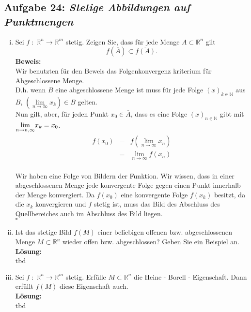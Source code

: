 \subsection*{Aufgabe 24: \mdseries\itshape Stetige Abbildungen auf Punktmengen}
\begin{enumerate}[(i)]
    \item Sei $f \; : \; \mathbb{R}^n \rightarrow \mathbb{R}^m$ stetig. Zeigen Sie, dass für jede
        Menge $ A \subset \mathbb{R}^n$ gilt
        $$
            f(\overline{A}) \subset \overline{f(A)}.
        $$
    \textbf{Beweis:}\\
        Wir benutzten für den Beweis das Folgenkonvergenz kriterium für Abgeschlossene Menge.\\
        D.h. wenn $B$ eine abgeschlossene Menge ist muss
        für jede Folge $(x)_{k\in \mathbb{N}}$ aus $B$,
        $\left( \underset{n \rightarrow \infty}{\lim} x_k \right) \in B$ gelten.\\

        Nun gilt, aber, für jeden Punkt $x_0 \in \overline{A}$, dass es eine Folge
        $(x)_{n \in \mathbb{N}}$ gibt mit $\underset{ n \rightarrow n,\infty}{\lim} x_k = x_0$.
        $$\begin{array}{rcl}
            f(x_0) &=& f(\underset{n \rightarrow \infty}{\lim} x_n)\\
                &=& \underset{n \rightarrow \infty}{\lim} f(x_n)\\
        \end{array}$$

        Wir haben eine Folge von Bildern der Funktion. Wir wissen, dass in einer abgeschlossenen
        Menge jede konvergente Folge gegen einen Punkt innerhalb der Menge konvergiert.
        Da $f(x_0)$ eine konvergente Folge $f(x_k)$ besitzt, da die $x_k$ konvergieren und $f$ stetig
        ist, muss das Bild des Abschluss des Quellbereiches  auch im Abschluss des Bild liegen.\\
        \mbox{} \hfill $\square$

    \item Ist das stetige Bild $f(M)$ einer beliebigen offenen bzw. abgeschlossenen Menge 
        $M \subset \mathbb{R}^n$ wieder offen bzw. abgeschlossen? Geben Sie ein Beispiel an.\\
    \textbf{Lösung:}\\
        tbd

    \item Sei $ f \; : \; \mathbb{R}^n \rightarrow \mathbb{R}^m$ stetig. Erfülle $M \subset \mathbb{R}^n$
        die Heine - Borell - Eigenschaft. Dann erfüllt $f(M)$ diese Eigenschaft auch.\\
    \textbf{Lösung:}\\
        tbd
\end{enumerate}

